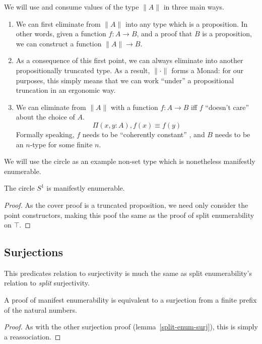 \begin{rm-definition}
  We will use and consume values of the type \(\lVert A \rVert\) in three main
  ways.
  \begin{enumerate}
    \item \label{elim-prop-prop} We can first eliminate from \(\lVert A \rVert\)
      into any type which is a proposition.
      In other words, given a function \(f : A \rightarrow B\), and a proof that
      \(B\) is a proposition, we can construct a function \(\lVert A \rVert
      \rightarrow B\).
    \item \label{elim-prop-monad} As a consequence of this first point, we can
      always eliminate into another propositionally truncated type.
      As a result, \(\lVert \cdot \rVert\) forms a Monad: for our purposes, this
      simply means that we can work ``under'' a propositional truncation in an
      ergonomic way.
    \item \label{elim-prop-coh} We can eliminate from \(\lVert A \rVert\) with a
      function \(f : A \rightarrow B\) iff \(f\) ``doesn't care'' about the
      choice of \(A\).
      \begin{equation}
        \Pi {(x , y : A)} , f(x) \equiv f(y)
      \end{equation}
      Formally speaking, \(f\) needs to be ``coherently constant''
      \cite{krausGeneralUniversalProperty2015}, and \(B\) needs to be an
      \(n\)-type for some finite \(n\).
  \end{enumerate}
\end{rm-definition}

We will use the circle as an example non-set type which is nonetheless
manifestly enumerable.
\begin{rm-theorem}
  The circle \(S^1\) is manifestly enumerable.
\end{rm-theorem}
\begin{proof}
  As the cover proof is a truncated proposition, we need only consider the point
  constructors, making this poof the same as the proof of split enumerability on
  \(\top\).
\end{proof}
\subsection{Surjections}
This predicates relation to surjectivity is much the same as split
enumerability's relation to \emph{split} surjectivity.
\begin{rm-lemma}
  A proof of manifest enumerability is equivalent to a surjection from a finite
  prefix of the natural numbers.
\end{rm-lemma}
\begin{proof}
  As with the other surjection proof (lemma~\ref{split-enum-surj}), this is
  simply a reassociation.
\end{proof}
